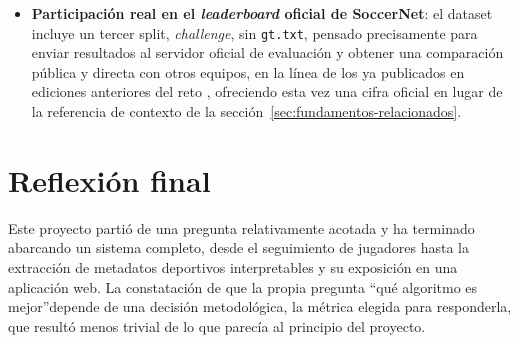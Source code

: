 \begin{itemize}
        el propio usuario suba un vídeo de fútbol arbitrario a la
        aplicación web y ejecutar el pipeline de tracking sobre él, en
        lugar de limitarse a las secuencias de demostración ya procesadas.
        A diferencia del resto de este proyecto, que parte de detecciones
        ya calculadas por SoccerNet (sección~\ref{sec:intro-problema}), esta
        vía exigiría incorporar primero un detector de objetos propio, ya
        que un vídeo arbitrario no viene con \texttt{det.txt}. Es
        técnicamente viable con el enfoque ya desarrollado, pero queda
        como línea futura.
  \item \textbf{Participación real en el \emph{leaderboard} oficial de
        SoccerNet}: el dataset incluye un tercer split, \emph{challenge},
        sin \texttt{gt.txt},
        pensado precisamente para enviar resultados al servidor oficial de
        evaluación y obtener una comparación pública y directa con otros
        equipos, en la línea de los ya publicados en ediciones anteriores
        del reto \citep{cioppa2023soccernetchallenges}, ofreciendo esta vez
        una cifra oficial en lugar de la referencia de contexto de la
        sección~\ref{sec:fundamentos-relacionados}.
\end{itemize}

\section{Reflexión final}
\label{sec:conclusiones-reflexion}

Este proyecto partió de una pregunta relativamente acotada
 y ha terminado abarcando un sistema completo, desde el
seguimiento de jugadores hasta la extracción de metadatos deportivos
interpretables y su exposición en una aplicación web. La constatación de que la propia pregunta
\enquote{qué algoritmo es mejor}depende de una decisión metodológica, la métrica
elegida para responderla, que resultó menos trivial de lo que parecía al
principio del proyecto.
